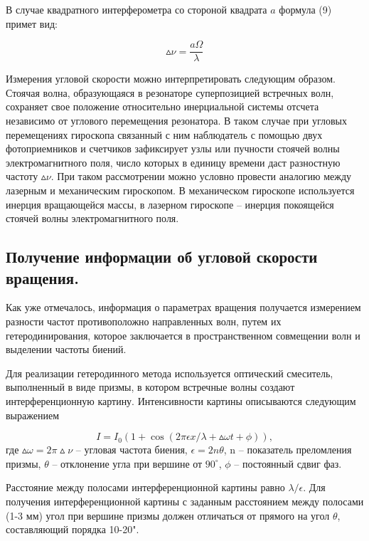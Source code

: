 \documentclass[a4paper,12pt]{article} %
\begin{document}
В случае квадратного интерферометра со стороной квадрата $a$ формула (9)
примет вид:

\begin{equation*}
    \vartriangle \!\! \nu = \frac {a \Omega} {\lambda}
\end{equation*}

Измерения угловой скорости можно интерпретировать следующим образом. Стоячая волна, образующаяся в резонаторе суперпозицией встречных волн, сохраняет свое положение относительно инерциальной системы отсчета
независимо от углового перемещения резонатора. В таком случае при угловых
перемещениях гироскопа связанный с ним наблюдатель с помощью двух фотоприемников и счетчиков зафиксирует узлы или пучности стоячей волны электромагнитного поля, число которых в единицу времени даст разностную частоту $\vartriangle \! \! \nu$. При таком рассмотрении можно условно провести аналогию между лазерным и механическим гироскопом. В механическом гироскопе используется
инерция вращающейся массы, в лазерном гироскопе – инерция покоящейся
стоячей волны электромагнитного поля.

\subsection{Получение информации об угловой скорости вращения.}

Как уже отмечалось, информация о параметрах вращения получается измерением разности частот противоположно направленных волн, путем их гетеродинирования, которое заключается в пространственном совмещении волн и
выделении частоты биений.

Для реализации гетеродинного метода используется оптический смеситель, выполненный в виде призмы, в котором встречные волны создают
интерференционную картину. Интенсивности картины описываются следующим выражением

\begin{equation*}
    I = I_0 (1 + \cos(2 \pi \epsilon x / \lambda + \vartriangle \! \! \omega t +
    \phi)),
\end{equation*}
где $\vartriangle \! \! \omega = 2 \pi \! \! \vartriangle \! \! \nu$ -- угловая частота биения, $\epsilon = 2 n \theta$, n -- показатель преломления призмы, $\theta$ -- отклонение угла при вершине от $90^\circ$, $\phi$ -- постоянный сдвиг фаз.

Расстояние между полосами интерференционной картины равно $\lambda / \epsilon$. Для получения интерференционной картины с заданным расстоянием между полосами (1-3 мм) угол при вершине призмы должен отличаться от прямого на угол $\theta$, составляющий порядка 10-20".
\end{document}
